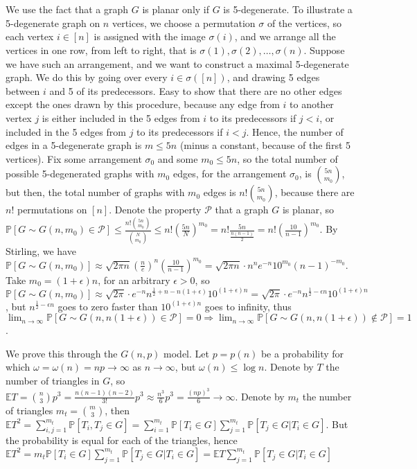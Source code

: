 \documentclass{article}
\begin{document}
\section{}
We use the fact that a graph $G$ is planar only if $G$ is 5-degenerate. To illustrate a 5-degenerate graph on $n$ vertices, we choose a permutation $\sigma$ of the vertices, so each vertex $i\in[n]$ is assigned with the image $\sigma(i)$, and we arrange all the vertices in one row, from left to right, that is $\sigma(1),\sigma(2),\dots,\sigma(n)$. Suppose we have such an arrangement, and we want to construct a maximal 5-degenerate graph. We do this by going over every $i\in\sigma([n])$, and drawing 5 edges between $i$ and 5 of its predecessors. Easy to show that there are no other edges except the ones drawn by this procedure, because any edge from $i$ to another vertex $j$ is either included in the 5 edges from $i$ to its predecessors if $j<i$, or included in the 5 edges from $j$ to its predecessors if $i<j$. Hence, the number of edges in a 5-degenerate graph is $m\leq{5n}$ (minus a constant, because of the first 5 vertices). Fix some arrangement $\sigma_0$ and some $m_0\leq{5n}$, so the total number of possible 5-degenerated graphs with $m_0$ edges, for the arrangement $\sigma_0$, is $\binom{5n}{m_0}$, but then, the total number of graphs with $m_0$ edges is $n!\binom{5n}{m_0}$, because there are $n!$ permutations on $[n]$. Denote the property $\mathcal{P}$ that a graph $G$ is planar, so $\mathbb{P}[G\sim{G(n,m_0)}\in\mathcal{P}]\leq{\frac{n!\binom{5n}{m_0}}{\binom{N}{m_0}}}\leq{n!(\frac{5n}{N})^{m_0}}=n!\frac{5n}{\frac{n(n-1)}{2}}=n!(\frac{10}{n-1})^{m_0}$. By Stirling, we have $\mathbb{P}[G\sim{G(n,m_0)}]\approx{\sqrt{2\pi{n}}(\frac{n}{e})^n(\frac{10}{n-1})^{m_0}}=\sqrt{2\pi{n}}\cdot{n^n}{e^{-n}}{10^{m_0}}{(n-1)^{-m_0}}$. Take $m_0=(1+\epsilon)n$, for an arbitrary $\epsilon>0$, so $\mathbb{P}[G\sim{G(n,m_0)}]\approx{\sqrt{2\pi}\cdot{e^{-n}n^{\frac{1}{2}+n-n(1+\epsilon)}10^{(1+\epsilon)n}}}=\sqrt{2\pi}\cdot{e^{-n}n^{\frac{1}{2}-\epsilon{n}}10^{(1+\epsilon)n}}$, but $n^{\frac{1}{2}-\epsilon{n}}$ goes to zero faster than $10^{(1+\epsilon)n}$ goes to infinity, thus $\lim_{n\rightarrow\infty}\mathbb{P}[G\sim{G(n,n(1+\epsilon))}\in\mathcal{P}]=0\Rightarrow\lim_{n\rightarrow\infty}\mathbb{P}[G\sim{G(n,n(1+\epsilon))}\notin\mathcal{P}]=1$.






We prove this through the $G(n,p)$ model. Let $p=p(n)$ be a probability for which $\omega=\omega(n)=np\rightarrow\infty$ as $n\rightarrow\infty$, but $\omega(n)\leq{\log{n}}$. Denote by $T$ the number of triangles in $G$, so $\mathbb{E}T=\binom{n}{3}p^3=\frac{n(n-1)(n-2)}{3!}p^3\approx\frac{n^3}{6}p^3=\frac{(np)^3}{6}\rightarrow\infty$. Denote by $m_t$ the number of triangles $m_t=\binom{m}{3}$, then $\mathbb{E}T^2=\sum_{i,j=1}^{m_t}\mathbb{P}[T_i,T_j\in{G}]=\sum_{i=1}^{m_t}\mathbb{P}[T_i\in{G}]\sum_{j=1}^{m_t}\mathbb{P}[T_j\in{G}|T_i\in{G}]$. But the probability is equal for each of the triangles, hence $\mathbb{E}T^2=m_t\mathbb{P}[T_i\in{G}]\sum_{j=1}^{m_t}\mathbb{P}[T_j\in{G}|T_i\in{G}]=\mathbb{E}T\sum_{j=1}^{m_t}\mathbb{P}[T_j\in{G}|T_i\in{G}]$
\end{document}
